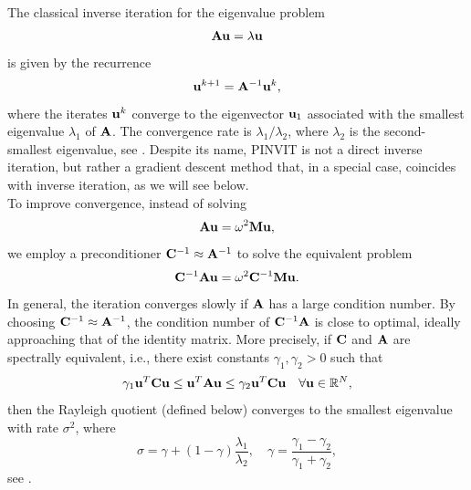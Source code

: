 The classical inverse iteration for the eigenvalue problem
\[
\mathbf{A} \mathbf{u} = \lambda \mathbf{u}
\]
is given by the recurrence
\[
\mathbf{u}^{k+1} = \mathbf{A}^{-1}\mathbf{u}^k,
\]
where the iterates $\mathbf{u}^k$ converge to the eigenvector $\mathbf{u}_1$ associated with the smallest eigenvalue $\lambda_1$ of $\mathbf{A}$. The convergence rate is $\lambda_1/\lambda_2$, where $\lambda_2$ is the second-smallest eigenvalue, see \cite{Melenk21}. Despite its name, PINVIT is not a direct inverse iteration, but rather a gradient descent method that, in a special case, coincides with inverse iteration, as we will see below.\\

To improve convergence, instead of solving
\[
\mathbf{A} \mathbf{u} = \omega^2 \mathbf{M} \mathbf{u},
\]
we employ a preconditioner $\mathbf{C}^{-1} \approx \mathbf{A}^{-1}$ to solve the equivalent problem
\[
\mathbf{C}^{-1}\mathbf{A} \mathbf{u} = \omega^2 \mathbf{C}^{-1}\mathbf{M} \mathbf{u}.
\]
In general, the iteration converges slowly if $\mathbf{A}$ has a large condition number. By choosing $\mathbf{C}^{-1} \approx \mathbf{A}^{-1}$, the condition number of $\mathbf{C}^{-1}\mathbf{A}$ is close to optimal, ideally approaching that of the identity matrix. More precisely, if $\mathbf{C}$ and $\mathbf{A}$ are spectrally equivalent, i.e., there exist constants $\gamma_1,\gamma_2>0$ such that
\[
\gamma_1 \mathbf{u}^T \mathbf{C} \mathbf{u} \leq \mathbf{u}^T \mathbf{A} \mathbf{u} \leq \gamma_2 \mathbf{u}^T \mathbf{C} \mathbf{u} \quad \forall \mathbf{u} \in \mathbb{R}^N,
\]
then the Rayleigh quotient (defined below) converges to the smallest eigenvalue with rate $\sigma^2$, where
\[
\sigma = \gamma + (1-\gamma)\frac{\lambda_1}{\lambda_{2}}, \quad 
\gamma = \frac{\gamma_1 - \gamma_2}{\gamma_1 + \gamma_2},
\]
see \cite{Faustmann+Melenk24}.\\

